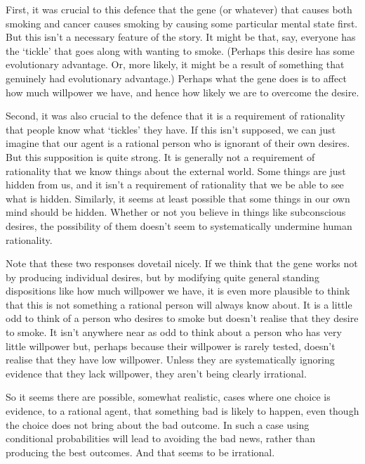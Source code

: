 First, it was crucial to this defence that the gene (or whatever) that causes both smoking and cancer causes smoking by causing some particular mental state first. But this isn't a necessary feature of the story. It might be that, say, everyone has the `tickle' that goes along with wanting to smoke. (Perhaps this desire has some evolutionary advantage. Or, more likely, it might be a result of something that genuinely had evolutionary advantage.) Perhaps what the gene does is to affect how much willpower we have, and hence how likely we are to overcome the desire. 

Second, it was also crucial to the defence that it is a requirement of rationality that people know what `tickles' they have. If this isn't supposed, we can just imagine that our agent is a rational person who is ignorant of their own desires. But this supposition is quite strong. It is generally not a requirement of rationality that we know things about the external world. Some things are just hidden from us, and it isn't a requirement of rationality that we be able to see what is hidden. Similarly, it seems at least possible that some things in our own mind should be hidden. Whether or not you believe in things like subconscious desires, the possibility of them doesn't seem to systematically undermine human rationality.

Note that these two responses dovetail nicely. If we think that the gene works not by producing individual desires, but by modifying quite general standing dispositions like how much willpower we have, it is even more plausible to think that this is not something a rational person will always know about. It is a little odd to think of a person who desires to smoke but doesn't realise that they desire to smoke. It isn't anywhere near as odd to think about a person who has very little willpower but, perhaps because their willpower is rarely tested, doesn't realise that they have low willpower. Unless they are systematically ignoring evidence that they lack willpower, they aren't being clearly irrational.

So it seems there are possible, somewhat realistic, cases where one choice is evidence, to a rational agent, that something bad is likely to happen, even though the choice does not bring about the bad outcome. In such a case using conditional probabilities will lead to avoiding the bad news, rather than producing the best outcomes. And that seems to be irrational.